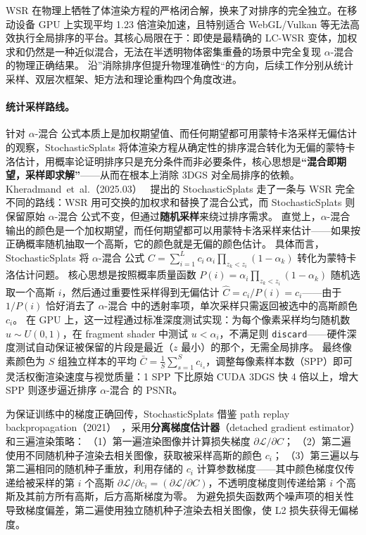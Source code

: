WSR 在物理上牺牲了体渲染方程的严格闭合解，换来了对排序的完全独立。在移动设备 GPU 上实现平均 1.23 倍渲染加速，且特别适合 WebGL/Vulkan 等无法高效执行全局排序的平台。其核心局限在于：即使是最精确的 LC-WSR 变体，加权求和仍然是一种近似混合，无法在半透明物体密集重叠的场景中完全复现 $\alpha$-混合 的物理正确结果。
沿”消除排序但提升物理准确性“的方向，后续工作分别从统计采样、双层次框架、矩方法和理论重构四个角度改进。

\paragraph{统计采样路线。}
针对 $\alpha$-混合 公式本质上是加权期望值、而任何期望都可用蒙特卡洛采样无偏估计的观察，StochasticSplats 将体渲染方程从确定性的排序混合转化为无偏的蒙特卡洛估计，用概率论证明排序只是充分条件而非必要条件，核心思想是\textbf{``混合即期望，采样即求解''}——从而在根本上消除 3DGS 对全局排序的依赖。Kheradmand~et~al.（2025.03）~\cite{2503_24366} 提出的 StochasticSplats 走了一条与 WSR 完全不同的路线：WSR 用可交换的加权求和替换了混合公式，而 StochasticSplats 则保留原始 $\alpha$-混合 公式不变，但通过\textbf{随机采样}来绕过排序需求。
直觉上，$\alpha$-混合 输出的颜色是一个加权期望，而任何期望都可以用蒙特卡洛采样来估计——如果按正确概率随机抽取一个高斯，它的颜色就是无偏的颜色估计。
具体而言，StochasticSplats 将 $\alpha$-混合 公式 $C = \sum_{i=1}^{L} c_i\,\alpha_i \prod_{z_k < z_i}(1-\alpha_k)$ 转化为蒙特卡洛估计问题。
核心思想是按照概率质量函数 $P(i) = \alpha_i \prod_{z_k < z_i}(1-\alpha_k)$ 随机选取一个高斯 $i$，然后通过重要性采样得到无偏估计 $\hat{C} = c_i / P(i) = c_i$——由于 $1/P(i)$ 恰好消去了 $\alpha$-混合 中的透射率项，单次采样只需返回被选中的高斯颜色 $c_i$。
在 GPU 上，这一过程通过标准深度测试实现：为每个像素采样均匀随机数 $u \sim U(0,1)$，在 fragment shader 中测试 $u < \alpha_i$，不满足则 \texttt{discard}——硬件深度测试自动保证被保留的片段是最近（$z$ 最小）的那个，无需全局排序。
最终像素颜色为 $S$ 组独立样本的平均 $\bar{C} = \frac{1}{S}\sum_{s=1}^{S} c_{i_s}$，调整每像素样本数（SPP）即可灵活权衡渲染速度与视觉质量：1 SPP 下比原始 CUDA 3DGS 快 4 倍以上，增大 SPP 则逐步逼近排序 $\alpha$-混合 的 PSNR。

为保证训练中的梯度正确回传，StochasticSplats 借鉴 path replay backpropagation（2021）~\cite{Vicini2021PathReplay}，采用\textbf{分离梯度估计器}（detached gradient estimator）和三遍渲染策略：
（1）第一遍渲染图像并计算损失梯度 $\partial\mathcal{L}/\partial C$；
（2）第二遍使用不同随机种子渲染去相关图像，获取被采样高斯的颜色 $c_i$；
（3）第三遍以与第二遍相同的随机种子重放，利用存储的 $c_i$ 计算参数梯度——其中颜色梯度仅传递给被采样的第 $i$ 个高斯 $\partial\mathcal{L}/\partial c_i = (\partial\mathcal{L}/\partial C)$，不透明度梯度则传递给第 $i$ 个高斯及其前方所有高斯，后方高斯梯度为零。
为避免损失函数两个噪声项的相关性导致梯度偏差，第二遍使用独立随机种子渲染去相关图像，使 L2 损失获得无偏梯度。

